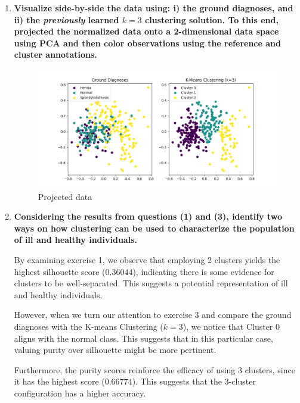 \documentclass[12pt]{article}
\begin{document}
\begin{enumerate}[leftmargin=\labelsep]
\begin{enumerate}
        \end{enumerate}

  \item \textbf{Visualize side-by-side the data using: i) the ground diagnoses, and ii) the \textit{previously} learned
          $k = 3$ clustering solution. To this end, projected the normalized data onto a 2-dimensional data
          space using PCA and then color observations using the reference and cluster annotations.}

        \vskip 0.3cm
        

        \begin{figure}[H]
          \centering
          \includegraphics[width=17cm]{./assets/ex3-plot.png}
          \caption{Projected data}
          \label{fig:PartII-ex3}
        \end{figure}

  \item \textbf{Considering the results from questions (1) and (3), identify two ways on how clustering can
          be used to characterize the population of ill and healthy individuals.}

        \vskip 0.3cm
        By examining exercise 1, we observe that employing 2 clusters yields the highest silhouette score ($0.36044$), 
         indicating there is some evidence for clusters to be well-separated. This suggests a potential representation of ill and healthy individuals.
  
        However, when we turn our attention to exercise 3 and compare the ground diagnoses with the K-means Clustering ($k=3$),
         we notice that Cluster 0 aligns with the normal class. This suggests that in this particular case, valuing purity over silhouette might be more pertinent.
  
        Furthermore, the purity scores reinforce the efficacy of using 3 clusters, since it has the highest score ($0.66774$). 
         This suggests that the 3-cluster configuration has a higher accuracy.


\end{enumerate}
\end{document}

